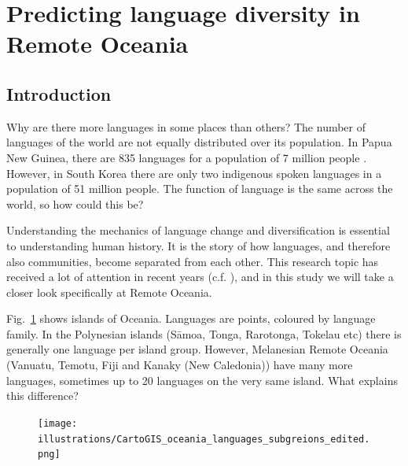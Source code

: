 \documentclass[a4paper,10pt]{article} %
\begin{document}


\newpage

\section{Predicting language diversity in Remote Oceania}
\label{study_pol_complex}
\subsection{Introduction}
\doublespacing
Why are there more languages in some places than others? The number of languages of the world are not equally distributed over its population. In Papua New Guinea, there are 835 languages for a population of 7 million people \citep{ethnologue22, cia_world_factbook_2019}. However, in South Korea there are only two indigenous spoken languages in a population of 51 million people. The function of language is the same across the world, so how could this be?

Understanding the mechanics of language change and diversification is essential to understanding human history. It is the story of how languages, and therefore also communities, become separated from each other. This research topic has received a lot of attention in recent years (c.f. \citet{gavin2017process,  greenhill2015demographic, Pacheco_Coelho_2019, hua2019ecological}), and in this study we will take a closer look specifically at Remote Oceania. 

Fig.~\ref{RO_overnight_coloured_dots} shows islands of Oceania. Languages are points, coloured by language family. In the Polynesian islands (S\={a}moa, Tonga, Rarotonga, Tokelau etc) there is generally one language per island group. However, Melanesian Remote Oceania (Vanuatu, Temotu, Fiji and Kanaky (New Caledonia)) have many more languages, sometimes up to 20 languages on the very same island. What explains this difference?



\begin{figure}
\centering
\texttt{[image: illustrations/CartoGIS\_oceania\_languages\_subgreions\_edited.png]}
\caption{}
\label{RO_overnight_coloured_dots}
\end{figure}





\end{document}

